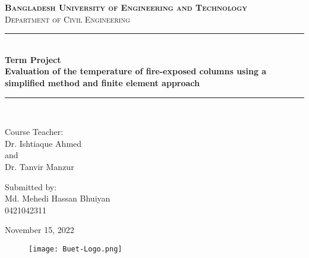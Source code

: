 \documentclass[12pt, letterpaper, oneside]{report}
\begin{document}
\begin{titlepage}

\newcommand{\HRule}{\rule{\linewidth}{0.5mm}} %

\center %
 

\textsc{\Huge \bf Bangladesh University of Engineering and Technology}\\[0.5cm] %
\textsc{\Large Department of Civil Engineering}\\[0.1cm]

\HRule \\[0.4cm]
{ \huge \bfseries Term Project}\\[0.4cm] %
{ \Large \bfseries Evaluation of the temperature of fire-exposed columns using a simplified method and finite element approach}\\[0.2cm]
\HRule \\[1.5cm]
 


\begin{minipage}{0.8\textwidth}
\begin{center} \large
Course Teacher: \\Dr. Ishtiaque Ahmed \\and \\Dr. Tanvir Manzur
\end{center}

\begin{center} \large
Submitted by: \\Md. Mehedi Hassan Bhuiyan \\0421042311
\end{center}

\begin{center}
November 15, 2022
\end{center}

\end{minipage}


\begin{figure}[h]
\centerline{\texttt{[image: Buet-Logo.png]}}

\label{logo}
\end{figure}



\end{titlepage}
\end{document}
